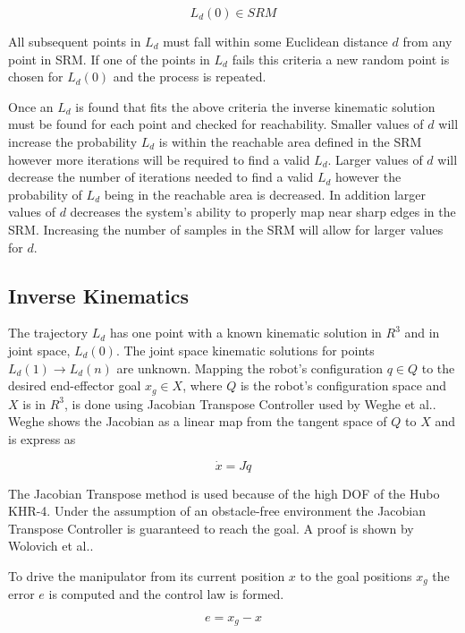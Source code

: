 \begin{equation}
L_d(0) \in SRM
\end{equation}

All subsequent points in $L_d$ must fall within some Euclidean distance $d$ from any point in SRM.  If one of the points in $L_d$ fails this criteria a new random point is chosen for $L_d(0)$ and the process is repeated. 

Once an $L_d$ is found that fits the above criteria the inverse kinematic solution must be found for each point and checked for reachability.  Smaller values of $d$ will increase the probability $L_d$ is within the reachable area defined in the SRM however more iterations will be required to find a valid $L_d$.  Larger values of $d$ will decrease the number of iterations needed to find a valid $L_d$ however the probability of $L_d$ being in the reachable area is decreased.  In addition larger values of $d$ decreases the system's ability to properly map near sharp edges in the SRM.  Increasing the number of samples in the SRM will allow for larger values for $d$.

\subsection{Inverse Kinematics}\label{sec:ik}
The trajectory $L_d$ has one point with a known kinematic solution in $R^3$ and in joint space, $L_d(0)$.  The joint space kinematic solutions for points $L_d(1) \rightarrow L_d(n)$ are unknown.  Mapping the robot's configuration $q \in Q$ to the desired end-effector goal $x_g \in X$, where $Q$ is the robot's configuration space and $X$ is in $R^3$, is done using Jacobian Transpose Controller used by Weghe et al.\cite{4813913}.  Weghe shows the Jacobian as a linear map from the tangent space of $Q$ to $X$ and is express as

\begin{equation}
\dot{x} = J\dot{q}
\end{equation}

  The Jacobian Transpose method is used because of the high DOF of the Hubo KHR-4.  Under the assumption of an obstacle-free environment the Jacobian Transpose Controller is guaranteed to reach the goal.  A proof is shown by Wolovich et al.\cite{4048118}.

To drive the manipulator from its current position $x$ to the goal positions $x_g$ the error $e$ is computed and the control law is formed.

\begin{equation}
e = x_g - x
\end{equation}

